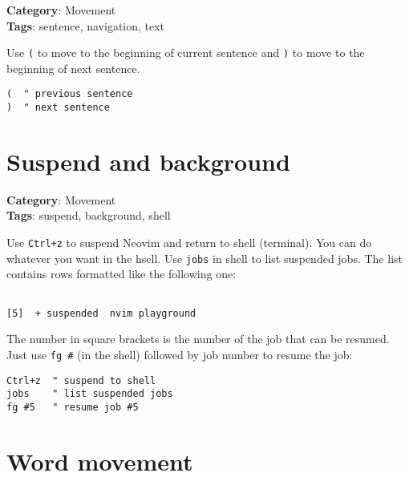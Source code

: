 {{{{{{{{\textbf{Category}: Movement\\ \textbf{Tags}: sentence, navigation, text
\vspace{0.5cm}

Use {\footnotesize \Verb§(§} to move to the beginning of current sentence and {\footnotesize \Verb§)§} to move to the beginning of next sentence.

\begin{Exa*}{}
\begin{Verbatim}[fontsize=\footnotesize, breaklines, breakanywhere]
(  " previous sentence
)  " next sentence
\end{Verbatim}
\end{Exa*}

\section{Suspend and background}

\textbf{Category}: Movement\\ \textbf{Tags}: suspend, background, shell
\vspace{0.5cm}

Use {\footnotesize \Verb§Ctrl+z§} to suspend Neovim and return to shell (terminal). You can do whatever you want in the hsell. Use {\footnotesize \Verb§jobs§} in shell to list suspended jobs. The list contains rows formatted like the following one:

\begin{Exa*}{}
\begin{Verbatim}[fontsize=\footnotesize, breaklines, breakanywhere]

[5]  + suspended  nvim playground
\end{Verbatim}
\end{Exa*}

The number in square brackets is the number of the job that can be resumed. Just use {\footnotesize \Verb§fg #§} (in the shell) followed by job number to resume the job:

\begin{Exa*}{}
\begin{Verbatim}[fontsize=\footnotesize, breaklines, breakanywhere]
Ctrl+z  " suspend to shell
jobs    " list suspended jobs
fg #5   " resume job #5
\end{Verbatim}
\end{Exa*}

\section{Word movement}

}}}}}}}}
